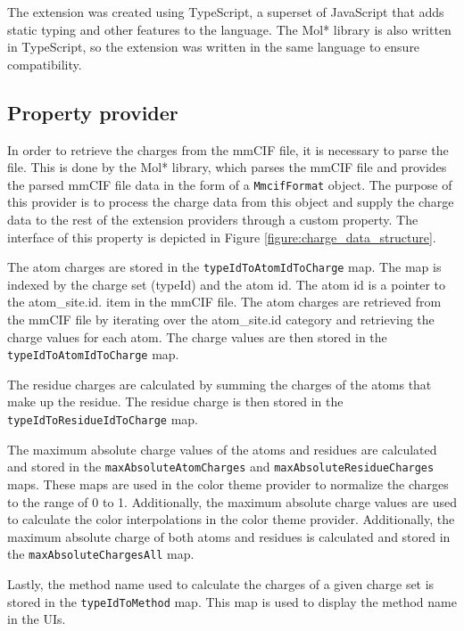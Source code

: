 \documentclass[
  digital,     %
  oneside,     %
  nosansbold,  %
  nocolorbold, %
  lof,         %
  lot,         %
]{fithesis4}
\begin{document}
The extension was created using TypeScript, a superset of JavaScript that adds static typing and other features to the language. The Mol* library is also written in TypeScript, so the extension was written in the same language to ensure compatibility.

\subsection{Property provider}
\label{subsection:property_provider}

In order to retrieve the charges from the mmCIF file, it is necessary to parse the file. This is done by the Mol* library, which parses the mmCIF file and provides the parsed mmCIF file data in the form of a \texttt{MmcifFormat} object. The purpose of this provider is to process the charge data from this object and supply the charge data to the rest of the extension providers through a custom property. The interface of this property is depicted in Figure \ref{figure:charge_data_structure}.

The atom charges are stored in the \texttt{typeIdToAtomIdToCharge} map. The map is indexed by the charge set (typeId) and the atom id. The atom id is a pointer to the atom\_site.id. item in the mmCIF file. The atom charges are retrieved from the mmCIF file by iterating over the atom\_site.id category and retrieving the charge values for each atom. The charge values are then stored in the \texttt{typeIdToAtomIdToCharge} map.

The residue charges are calculated by summing the charges of the atoms that make up the residue. The residue charge is then stored in the \texttt{typeIdToResidueIdToCharge} map.

The maximum absolute charge values of the atoms and residues are calculated and stored in the \texttt{maxAbsoluteAtomCharges} and \texttt{maxAbsoluteResidueCharges} maps. These maps are used in the color theme provider to normalize the charges to the range of 0 to 1. Additionally, the maximum absolute charge values are used to calculate the color interpolations in the color theme provider. Additionally, the maximum absolute charge of both atoms and residues is calculated and stored in the \texttt{maxAbsoluteChargesAll} map.

Lastly, the method name used to calculate the charges of a given charge set is stored in the \texttt{typeIdToMethod} map. This map is used to display the method name in the UIs.
\end{document}
